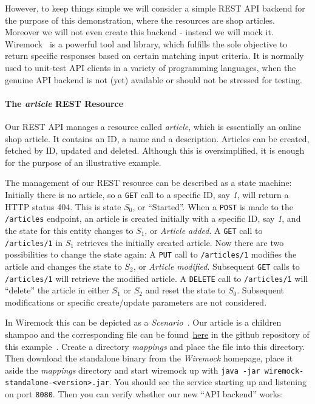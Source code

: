 \documentclass[paper=a4,11pt,numbers=noenddot]{article}
\begin{document}
However, to keep things simple we will consider a simple REST API backend for the purpose of this demonstration, where the resources are shop articles. Moreover we will not even create this backend - instead we will mock it. Wiremock~\autocite{noauthor_wiremock_nodate} is a powerful tool and library, which fulfills the sole objective to return specific responses based on certain matching input criteria. It is normally used to unit-test API clients in a variety of programming languages, when the genuine API backend is not (yet) available or should not be stressed for testing.

\paragraph{The \emph{article} REST Resource}

Our REST API manages a resource called \emph{article}, which is essentially an online shop article. It contains an ID, a name and a description. Articles can be created, fetched by ID, updated and deleted. Although this is oversimplified, it is enough for the purpose of an illustrative example.

The management of our REST resource can be described as a state machine: Initially there is no article, so a \verb'GET' call to a specific ID, say \emph{1}, will return a HTTP status 404. This is state $S_0$, or ``Started''. When a \verb'POST' is made to the \verb'/articles' endpoint, an article is created initially with a specific ID, say \emph{1}, and the state for this entity changes to $S_1$, or \emph{Article added}. A \verb'GET' call to \verb'/articles/1' in $S_1$ retrieves the initially created article. Now there are two possibilities to change the state again: A \verb'PUT' call to \verb'/articles/1' modifies the article and changes the state to $S_2$, or \emph{Article modified}. Subsequent \verb'GET' calls to \verb'/articles/1' will retrieve the modified article. A \verb'DELETE' call to \verb'/articles/1' will ``delete'' the article in either $S_1$ or $S_2$ and reset the state to $S_0$. Subsequent modifications or specific create/update parameters are not considered.

In Wiremock this can be depicted as a \emph{Scenario}~\autocite{noauthor_wiremock_stateful_behavior_2025}. Our article is a children shampoo and the corresponding file can be found~\href{https://github.com/ecky-l/terraform-provider-example/blob/main/src/wiremock/mappings/shampoo.json}{here} in the github repository of this example~\autocite{ecky-l_terraform-provider-example_nodate}. Create a directory \emph{mappings} and place the file into this directory. Then download the standalone binary from the \emph{Wiremock} homepage, place it aside the \emph{mappings} directory and start wiremock up with \verb'java -jar wiremock-standalone-<version>.jar'. You should see the service starting up and listening on port \verb'8080'. Then you can verify whether our new ``API backend'' works:
\end{document}
